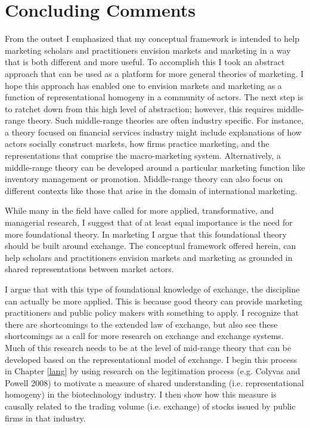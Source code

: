 \section{Concluding Comments}
From the outset I emphasized that my conceptual framework is intended to help marketing scholars and practitioners envision markets and marketing in a way that is both different and more useful. To accomplish this I took an abstract approach that can be used as a platform for more general theories of marketing. I hope this approach has enabled one to envision markets and marketing as a function of representational homogeny in a community of actors. The next step is to ratchet down from this high level of abstraction; however, this requires middle-range theory. Such middle-range theories are often industry specific. For instance, a theory focused on financial services industry might include explanations of how actors socially construct markets, how firms practice marketing, and the representations that comprise the macro-marketing system. Alternatively, a middle-range theory can be developed around a particular marketing function like inventory management or promotion. Middle-range theory can also focus on different contexts like those that arise in the domain of international marketing. 

While many in the field have called for more applied, transformative, and managerial research, I suggest that of at least equal importance is the need for more foundational theory. In marketing I argue that this foundational theory should be built around exchange. The conceptual framework offered herein, can help scholars and practitioners envision markets and marketing as grounded in shared representations between market actors. 
	
I argue that with this type of foundational knowledge of exchange, the discipline can actually be more applied. This is because good theory can provide marketing practitioners and public policy makers with something to apply. I recognize that there are shortcomings to the extended law of exchange, but also see these shortcomings as a call for more research on exchange and exchange systems. Much of this research needs to be at the level of mid-range theory that can be developed based on the representational model of exchange. I begin this process in Chapter \ref{lang} by using research on the legitimation process (e.g. Colyvas and Powell 2008) to motivate a measure of shared understanding (i.e. representational homogeny) in the biotechnology industry. I then show how this measure is causally related to the trading volume (i.e. exchange) of stocks issued by public firms in that industry.
